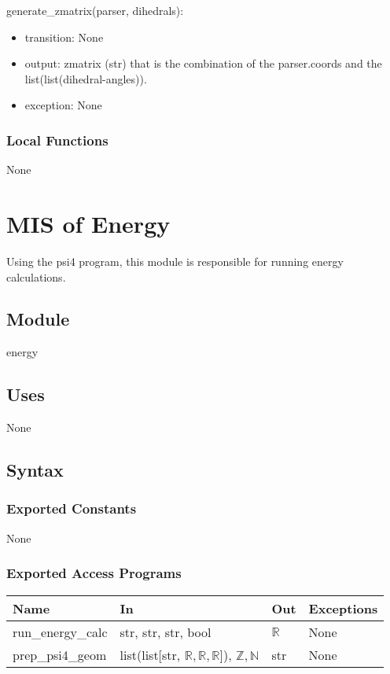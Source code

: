 \documentclass[12pt, titlepage]{article}
\begin{document}
\noindent generate\_zmatrix(parser, dihedrals):
\begin{itemize}
	\item transition: None
	\item output: zmatrix (str) that is the combination of the parser.coords 
	and the list(list(dihedral-angles)).
	\item exception: None
\end{itemize}

\subsubsection{Local Functions}

None

\section{MIS of Energy} \label{section-energies}

Using the psi4 program, this module is responsible for running energy 
calculations.

\subsection{Module}

energy

\subsection{Uses}

None

\subsection{Syntax}

\subsubsection{Exported Constants}

None

\subsubsection{Exported Access Programs}

\begin{center}
	\begin{tabular}{p{2cm} p{4cm} p{4cm} p{2cm}}
		\hline
		\textbf{Name} & \textbf{In} & \textbf{Out} & \textbf{Exceptions} \\
		\hline
		run\_energy\_calc & str, str, str, bool & $\mathbb{R}$ & None \\
		prep\_psi4\_geom & list(list[str, $\mathbb{R}, \mathbb{R}, 
		\mathbb{R}$]), $\mathbb{Z}, \mathbb{N}$ & str & None \\
		\hline
	\end{tabular}
\end{center}
\end{document}
